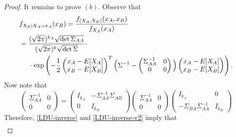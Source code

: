 \documentclass{book}
\theoremstyle{plain}%
\theoremstyle{definition}
\begin{document}
\begin{proof}
        It remains to prove $(b)$.
        Observe that
        \begin{align*}
            &f_{X_B|X_A=x_A}(x_B)
            =
            \frac{f_{(X_A,X_B)}(x_A,x_B)}{f_{X_A}(x_A)}\\
            &=
            \frac
            {(\sqrt{2\pi})^{k_A} \sqrt{\det \Sigma_{AA}}}
            {(\sqrt{2\pi})^k \sqrt{\det \Sigma}}\cdot\\
            &\hspace{0.5cm}
            \cdot
            \exp\left(
            -\frac{1}{2}
            \begin{pmatrix}
                x_A-E[X_A] \\ x_B-E[X_B]
            \end{pmatrix}^T
            \Big(
            \Sigma^{-1}
            -
            \begin{pmatrix}
                \Sigma_{AA}^{-1} & 0 \\ 0 & 0
            \end{pmatrix}
            \Big)
            \begin{pmatrix}
                x_A-E[X_A] \\ x_B-E[X_B]
            \end{pmatrix}
            \right).
        \end{align*}
        Now note that
        \begin{equation}
        \label{LDU-inverse-v2}
        \begin{pmatrix}
            \Sigma_{AA}^{-1} & 0\\
            0 & 0
        \end{pmatrix}
        =
        \begin{pmatrix}
            I_{k_A} & -\Sigma_{AA}^{-1}\Sigma_{AB}\\
            0 & I_{k_B}
        \end{pmatrix}
        \begin{pmatrix}
            \Sigma^{-1}_{AA} & 0\\
            0 & 0
        \end{pmatrix}
        \begin{pmatrix}
            I_{k_A} & 0\\
            -\Sigma_{BA}\Sigma_{AA}^{-1} & I_{k_B}
        \end{pmatrix}
        \end{equation}
        Therefore, \eqref{LDU-inverse} and \eqref{LDU-inverse-v2} imply
        that
        \begin{align}

\end{align}
\end{proof}
\end{document}
